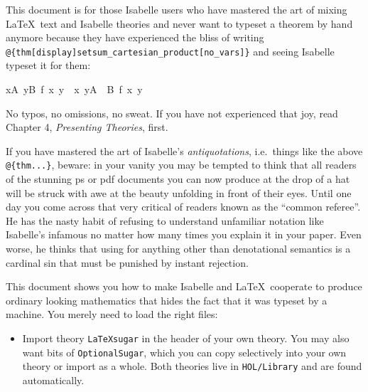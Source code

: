 %
\begin{isabellebody}%
\def\isabellecontext{Sugar}%
%
\isadelimtheory
%
\endisadelimtheory
%
\isatagtheory
%
\endisatagtheory
{\isafoldtheory}%
%
\isadelimtheory
%
\endisadelimtheory
%
\isamarkuptrue%
%
\begin{isamarkuptext}%
This document is for those Isabelle users who have mastered
the art of mixing \LaTeX\ text and Isabelle theories and never want to
typeset a theorem by hand anymore because they have experienced the
bliss of writing \verb!@!\verb!{thm[display]setsum_cartesian_product[no_vars]}!
and seeing Isabelle typeset it for them:
\begin{isabelle}%
{\isacharparenleft}{\isasymSum}x{\isasymin}A{\isachardot}\ {\isasymSum}y{\isasymin}B{\isachardot}\ f\ x\ y{\isacharparenright}\ {\isacharequal}\ {\isacharparenleft}{\isasymSum}{\isacharparenleft}x{\isacharcomma}\ y{\isacharparenright}{\isasymin}A\ {\isasymtimes}\ B{\isachardot}\ f\ x\ y{\isacharparenright}%
\end{isabelle}
No typos, no omissions, no sweat.
If you have not experienced that joy, read Chapter 4, \emph{Presenting
Theories}, \cite{LNCS2283} first.

If you have mastered the art of Isabelle's \emph{antiquotations},
i.e.\ things like the above \verb!@!\verb!{thm...}!, beware: in your vanity
you may be tempted to think that all readers of the stunning ps or pdf
documents you can now produce at the drop of a hat will be struck with
awe at the beauty unfolding in front of their eyes. Until one day you
come across that very critical of readers known as the ``common referee''.
He has the nasty habit of refusing to understand unfamiliar notation
like Isabelle's infamous \isa{{\isasymlbrakk}\ {\isasymrbrakk}\ {\isasymLongrightarrow}} no matter how many times you
explain it in your paper. Even worse, he thinks that using \isa{{\isasymlbrakk}\ {\isasymrbrakk}} for anything other than denotational semantics is a cardinal sin
that must be punished by instant rejection.


This document shows you how to make Isabelle and \LaTeX\ cooperate to
produce ordinary looking mathematics that hides the fact that it was
typeset by a machine. You merely need to load the right files:
\begin{itemize}
\item Import theory \texttt{LaTeXsugar} in the header of your own
theory.  You may also want bits of \texttt{OptionalSugar}, which you can
copy selectively into your own theory or import as a whole.  Both
theories live in \texttt{HOL/Library} and are found automatically.


\end{itemize}
\end{isamarkuptext}
\end{isabellebody}
